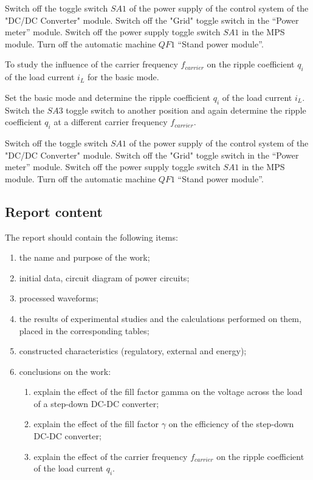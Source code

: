 \documentclass[a4paper,14pt]{article}
\begin{document}
\begin{enumerate}
Switch off the toggle switch $SA1$ of the power supply of the control system of the "DC/DC Converter" module.
Switch off the "Grid" toggle switch in the “Power meter” module.
Switch off the power supply toggle switch $SA1$ in the MPS module.
Turn off the automatic machine $QF1$ “Stand power module”.

To study the influence of the carrier frequency $f_{carrier}$ on the ripple coefficient $q_i$ of the load current $i_L$ for the basic mode.

Set the basic mode and determine the ripple coefficient $q_i$ of the load current $i_L$.
Switch the $SA3$ toggle switch to another position and again determine the ripple coefficient $q_i$ at a different carrier frequency $f_{carrier}$.

Switch off the toggle switch $SA1$ of the power supply of the control system of the "DC/DC Converter" module.
Switch off the "Grid" toggle switch in the “Power meter” module.
Switch off the power supply toggle switch $SA1$ in the MPS module.
Turn off the automatic machine $QF1$ “Stand power module”.


\end{enumerate}

\subsection{Report content}
The report should contain the following items:
\begin{enumerate}
	\item the name and purpose of the work;

	\item initial data, circuit diagram of power circuits;

	\item processed waveforms;

	\item the results of experimental studies and the calculations performed on them, placed in the corresponding tables;

	\item constructed characteristics (regulatory, external and energy);

	\item conclusions on the work:

	
	\begin{enumerate}
	\item explain the effect of the fill factor gamma on the voltage across the load of a step-down DC-DC converter; 
	\item explain the effect of the fill factor $\gamma$ on the efficiency of the step-down DC-DC converter; 
	\item explain the effect of the carrier frequency $f_{carrier}$ on the ripple coefficient of the load current $q_i$.
	\end{enumerate}
\end{enumerate}		
\end{document}
